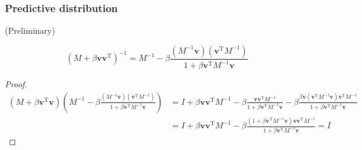 \subsubsection{Predictive distribution}
(Preliminary)
\begin{conclusion}
\begin{equation}
(M+\beta\mathbf{v}\mathbf{v}^{\mathrm{T}})^{-1}=M^{-1}-\beta\frac{(M^{-1}\mathbf{v})(\mathbf{v}^{\mathrm{T}}M^{-1})}{1+\beta\mathbf{v}^{\mathrm{T}}M^{-1}\mathbf{v}}
\label{eqn:appc3110}
\end{equation}
\end{conclusion}
\begin{proof}
\begin{equation}
\begin{split}
(M+\beta\mathbf{v}^{\mathrm{T}}\mathbf{v})(M^{-1}-\beta\frac{(M^{-1}\mathbf{v})(\mathbf{v}^{\mathrm{T}}M^{-1})}{1+\beta\mathbf{v}^{\mathrm{T}}M^{-1}\mathbf{v}})&=I+\beta\mathbf{v}\mathbf{v}^{\mathrm{T}}M^{-1}-\beta\frac{\mathbf{v}\mathbf{v}^{\mathrm{T}}M^{-1}}{1+\beta\mathbf{v}^{\mathrm{T}}M^{-1}\mathbf{v}}-\beta\frac{\beta\mathbf{v}(\mathbf{v}^{\mathrm{T}}M^{-1}\mathbf{v})\mathbf{v}^{\mathrm{T}}M^{-1}}{1+\beta\mathbf{v}^{\mathrm{T}}M^{-1}\mathbf{v}}\\
&=I+\beta\mathbf{v}\mathbf{v}^{\mathrm{T}}M^{-1}-\beta\frac{(1+\beta\mathbf{v}^{\mathrm{T}}M^{-1}\mathbf{v})\mathbf{v}\mathbf{v}^{\mathrm{T}}M^{-1}}{1+\beta\mathbf{v}^{\mathrm{T}}M^{-1}\mathbf{v}}=I
\end{split}
\end{equation}
\end{proof}


